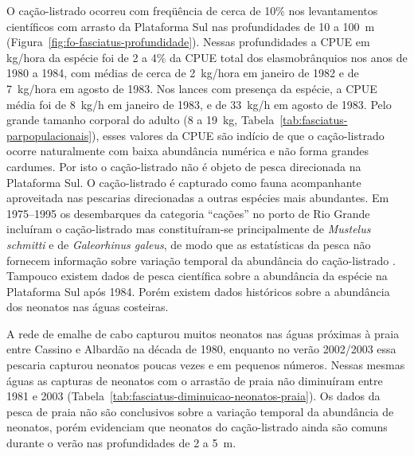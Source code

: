 \documentclass[a4paper,11pt,twoside,showtrims,onecolumn,openright,final]{memoir}
\begin{document}
O cação-listrado ocorreu com freqüência de cerca de 10\% nos levantamentos científicos 
com arrasto da Plataforma Sul nas profundidades de 10 a 100~m  (Figura~\ref{fig:fo-fasciatus-profundidade}). 
Nessas profundidades a CPUE em kg/hora da espécie foi de 2 a 4\% da CPUE total dos 
elasmobrânquios nos anos de 1980 a 1984, com médias de cerca de 2~kg/hora em janeiro 
de 1982 e de 7~kg/hora em agosto de 1983. Nos lances com presença da espécie, a CPUE média 
foi de 8~kg/h em janeiro de 1983, e de 33~kg/h em agosto de 1983. Pelo grande tamanho 
corporal do adulto (8 a 19~kg, Tabela~\ref{tab:fasciatus-parpopulacionais}), esses valores da  CPUE são indício de que o 
cação-listrado ocorre naturalmente com baixa abundância numérica e não forma grandes cardumes. 
Por isto o cação-listrado não é objeto de pesca direcionada na Plataforma Sul. 
O cação-listrado é capturado como fauna acompanhante aproveitada nas pescarias direcionadas 
a outras espécies mais abundantes. Em 1975--1995 os desembarques da categoria ``cações'' 
no porto de Rio Grande incluíram o cação-listrado mas constituíram-se principalmente 
de \emph{Mustelus schmitti} e de \emph{Galeorhinus galeus}, de modo que as estatísticas da pesca não fornecem 
informação sobre variação temporal da abundância 
do cação-listrado \citep{araujo1986,miranda2003}. %
Tampouco existem dados de pesca científica sobre a abundância da espécie na Plataforma Sul após 1984. 
Porém existem dados históricos sobre a  abundância dos neonatos nas águas costeiras. 

A rede de emalhe de cabo capturou muitos neonatos nas águas próximas à praia entre Cassino 
e Albardão na década de 1980, enquanto no verão 2002/2003 essa pescaria capturou neonatos poucas vezes 
e em pequenos números. Nessas mesmas águas as capturas de neonatos com o arrastão de praia não diminuíram 
entre 1981 e 2003 (Tabela~\ref{tab:fasciatus-diminuicao-neonatos-praia}). 
Os dados da pesca de praia não são conclusivos sobre a variação temporal 
da abundância de neonatos, porém evidenciam que neonatos do cação-listrado ainda são 
comuns durante o verão nas profundidades de 2 a 5~m. 

%
%
\end{document}
